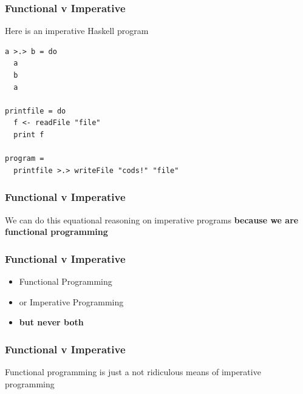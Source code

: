 \begin{frame}[fragile]
\frametitle{Functional v Imperative}
\begin{block}{Here is an imperative Haskell program}
\begin{lstlisting}[style=haskell,mathescape]
a >.> b = do
  a
  b
  a
  
printfile = do
  f <- readFile "file"
  print f

program =
  printfile >.> writeFile "cods!" "file"
\end{lstlisting}
\end{block}
\end{frame}


\begin{frame}[fragile]
\frametitle{Functional v Imperative}
\begin{block}{We can do this equational reasoning on imperative programs}
\textbf{because we are functional programming}
\end{block}
\end{frame}


\begin{frame}[fragile]
\frametitle{Functional v Imperative}
\begin{itemize}
  \item<1-> Functional Programming
  \item<2-> or Imperative Programming
  \item<3-> \textbf{but never both}
\end{itemize}
\end{frame}


\begin{frame}[fragile]
\frametitle{Functional v Imperative}
\begin{block}{Functional programming is}
just a \tiny{not ridiculous}\normalsize{ means of imperative programming}
\end{block}
\end{frame}


